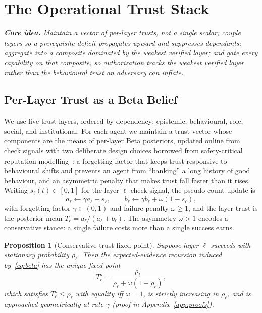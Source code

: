 \documentclass[sigconf,anonymous]{acmart}
\theoremstyle{plain}
\newtheorem{proposition}{Proposition}
\theoremstyle{definition}
\theoremstyle{remark}
\begin{document}
\section{The Operational Trust Stack}
\label{sec:model}

\begin{insightbox}
\textit{\textbf{Core idea.} Maintain a \emph{vector} of per-layer trusts, not a single
scalar; couple layers so a prerequisite deficit propagates upward and suppresses
dependants; aggregate into a composite dominated by the weakest verified layer; and gate
every capability on that composite, so authorization tracks the weakest verified layer
rather than the behavioural trust an adversary can inflate.}
\end{insightbox}

\subsection{Per-Layer Trust as a Beta Belief}
We use five trust layers, ordered by dependency: epistemic, behavioural, role, social, and
institutional. For each agent we maintain a trust vector whose components are the means of
per-layer Beta posteriors, updated online from check signals with two deliberate design
choices borrowed from safety-critical reputation modelling~\cite{josang2002beta,dynatrust2026}:
a forgetting factor that keeps trust responsive to behavioural shifts and prevents an
agent from ``banking'' a long history of good behaviour, and an asymmetric penalty that
makes trust fall faster than it rises. Writing $s_\ell(t)\in[0,1]$ for the layer-$\ell$
check signal, the pseudo-count update is
\begin{equation}
a_\ell \leftarrow \gamma a_\ell + s_\ell,\qquad
b_\ell  \leftarrow \gamma b_\ell + \omega(1-s_\ell),
\label{eq:beta}
\end{equation}
with forgetting factor $\gamma\in(0,1)$ and failure penalty $\omega\ge1$, and the layer
trust is the posterior mean $T_\ell=a_\ell/(a_\ell+b_\ell)$. The asymmetry $\omega>1$
encodes a conservative stance: a single failure costs more than a single success earns.

\begin{proposition}[Conservative trust fixed point]
\label{prop:fixedpoint}
Suppose layer $\ell$ succeeds with stationary probability $\rho_\ell$. Then the
expected-evidence recursion induced by~\eqref{eq:beta} has the unique fixed point
\begin{equation}
T_\ell^\star = \frac{\rho_\ell}{\rho_\ell+\omega(1-\rho_\ell)},
\label{eq:fixedpoint}
\end{equation}
which satisfies $T_\ell^\star\le\rho_\ell$ with equality iff $\omega=1$, is strictly
increasing in $\rho_\ell$, and is approached geometrically at rate $\gamma$
(proof in Appendix~\ref{app:proofs}).
\end{proposition}
\end{document}
